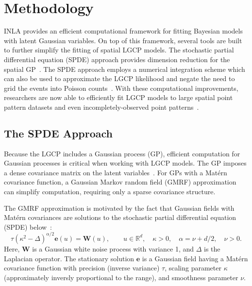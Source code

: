 \documentclass[]{interact}
\begin{document}



\section{Methodology}
\label{methods}

INLA provides an efficient computational framework for fitting Bayesian models
with latent Gaussian variables. On top of this framework, several tools are
built to further simplify the fitting of spatial LGCP models. The stochastic
partial differential equation (SPDE) approach provides dimension reduction for
the spatial GP~\cite{lindgrenetal}. The SPDE approach employs a numerical
integration scheme which can also be used to approximate the LGCP likelihood
and negate the need to grid the events into Poisson counts~\cite{simpsonetal}.
With these computational improvements, researchers are now able to efficiently
fit LGCP models to large spatial point pattern datasets and even
incompletely-observed point patterns~\cite{yuanetal}.  


\subsection{The SPDE Approach}
\label{spde}

Because the LGCP includes a Gaussian process (GP), efficient computation for
Gaussian processes is critical when working with LGCP models. The GP imposes a
dense covariance matrix on the latent variables~\cite{rinla}. For GPs with a
Mat\'{e}rn covariance function, a Gaussian Markov random field (GMRF)
approximation can simplify computation, requiring only a sparse covariance
structure.

The GMRF approximation is motivated by the fact that Gaussian fields with
Mat\'{e}rn covariances are solutions to the stochastic partial differential
equation (SPDE) below~\cite{lindgrenetal}:
\begin{displaymath}
\tau(\kappa^{2} - \Delta)^{\alpha / 2} \mathbf{e}(u) = \mathbf{W}(u),
\qquad u \in \mathbb{R}^d, \quad \kappa > 0,
\quad \alpha = \nu + d/2, \quad \nu > 0.
\end{displaymath}
Here, \(\mathbf{W}\) is a Gaussian white noise process with variance 1, and
\(\Delta\) is the Laplacian operator. The stationary solution
\(\mathbf{e}\) is a Gaussian field having a Mat\'{e}rn covariance
function with precision (inverse variance) \(\tau\),  scaling parameter
\(\kappa\) (approximately inversly proportional to the range), and smoothness
parameter \(\nu\).
\end{document}
